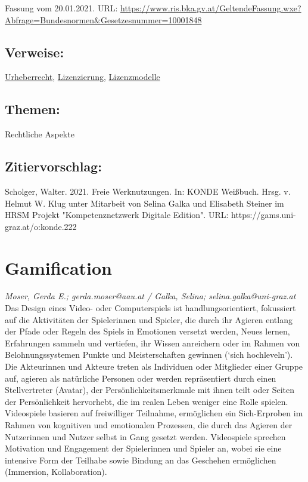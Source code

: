 \documentclass{article}
\begin{document}
\begin{itemize}
                              Fassung vom 20.01.2021. URL: \url{https://www.ris.bka.gv.at/GeltendeFassung.wxe?Abfrage=Bundesnormen&Gesetzesnummer=10001848}\end{itemize}\subsection*{Verweise:}\href{https://gams.uni-graz.at/o:konde.44}{Urheberrecht}, \href{https://gams.uni-graz.at/o:konde.119}{Lizenzierung}, \href{https://gams.uni-graz.at/o:konde.45}{Lizenzmodelle}\subsection*{Themen:}Rechtliche Aspekte\subsection*{Zitiervorschlag:}Scholger, Walter. 2021. Freie Werknutzungen. In: KONDE Weißbuch. Hrsg. v. Helmut W. Klug unter Mitarbeit von Selina Galka und Elisabeth Steiner im HRSM Projekt "Kompetenznetzwerk Digitale Edition". URL: https://gams.uni-graz.at/o:konde.222\newpage\section*{Gamification} \emph{Moser, Gerda E.; gerda.moser@aau.at / Galka, Selina; selina.galka@uni-graz.at }\\
        
    Das Design eines Video- oder Computerspiels ist handlungsorientiert, fokussiert auf die Aktivitäten der Spielerinnen und Spieler, die durch ihr Agieren entlang der Pfade oder Regeln des Spiels in Emotionen versetzt werden, Neues lernen, Erfahrungen sammeln und vertiefen, ihr Wissen anreichern oder im Rahmen von Belohnungssystemen Punkte und Meisterschaften gewinnen (‘sich hochleveln’). Die Akteurinnen und Akteure treten als Individuen oder Mitglieder einer Gruppe auf, agieren als natürliche Personen oder werden repräsentiert durch einen Stellvertreter (Avatar), der Persönlichkeitsmerkmale mit ihnen teilt oder Seiten der Persönlichkeit hervorhebt, die im realen Leben weniger eine Rolle spielen. Videospiele basieren auf freiwilliger Teilnahme, ermöglichen ein Sich-Erproben im Rahmen von kognitiven und emotionalen Prozessen, die durch das Agieren der Nutzerinnen und Nutzer selbst in Gang gesetzt werden. Videospiele sprechen Motivation und Engagement der Spielerinnen und Spieler an, wobei sie eine intensive Form der Teilhabe sowie Bindung an das Geschehen ermöglichen (Immersion, Kollaboration). \\
            
\end{document}

